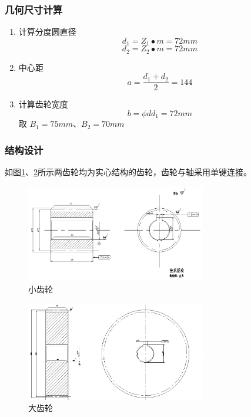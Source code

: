 \documentclass[a4paper,12pt]{article}
\begin{document}
\subsubsection{几何尺寸计算}
	
\begin{enumerate}
	\item 计算分度圆直径 $$d_1=Z_1\bullet m=72mm$$ $$d_2=Z_2\bullet m=72mm$$
	\item 中心距 $$ a=\frac{d_1+d_2}{2} =144$$
	\item 计算齿轮宽度 $$b=\phi d d_1 =72mm$$
   取 $B_1=75mm$、$B_2=70mm$
\end{enumerate}

\subsubsection{结构设计}
如图\ref{小齿轮}、\ref{大齿轮}所示两齿轮均为实心结构的齿轮，齿轮与轴采用单键连接。
\begin{figure}[htb]
	\begin{center} 
		\includegraphics[width=0.7\textwidth]{images/3}
		\caption{小齿轮}  \label{小齿轮}
	\end{center}
\end{figure}
\begin{figure}[htb]
	\begin{center} 
		\includegraphics[width=0.7\textwidth]{images/4}
		\caption{大齿轮}  \label{大齿轮}
	\end{center}
\end{figure}
\end{document}
